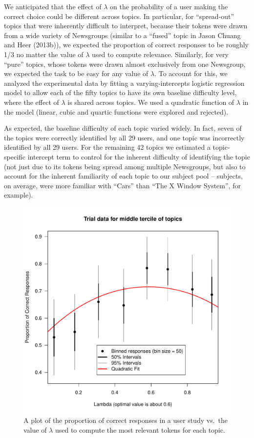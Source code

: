 \documentclass[12pt,]{isuthesis}
\begin{document}
We anticipated that the effect of \(\lambda\) on the probability of a
user making the correct choice could be different across topics. In
particular, for ``spread-out'' topics that were inherently difficult to
interpret, because their tokens were drawn from a wide variety of
Newsgroups (similar to a ``fused'' topic in Jason Chuang and Heer
(2013b)), we expected the proportion of correct responses to be roughly
1/3 no matter the value of \(\lambda\) used to compute relevance.
Similarly, for very ``pure'' topics, whose tokens were drawn almost
exclusively from one Newsgroup, we expected the task to be easy for any
value of \(\lambda\). To account for this, we analyzed the experimental
data by fitting a varying-intercepts logistic regression model to allow
each of the fifty topics to have its own baseline difficulty level,
where the effect of \(\lambda\) is shared across topics. We used a
quadratic function of \(\lambda\) in the model (linear, cubic and
quartic functions were explored and rejected).

As expected, the baseline difficulty of each topic varied widely. In
fact, seven of the topics were correctly identified by all 29 users, and
one topic was incorrectly identified by all 29 users. For the remaining
42 topics we estimated a topic-specific intercept term to control for
the inherent difficulty of identifying the topic (not just due to its
tokens being spread among multiple Newsgroups, but also to account for
the inherent familiarity of each topic to our subject pool -- subjects,
on average, were more familiar with ``Cars'' than ``The X Window
System'', for example).

\begin{figure}[htbp]
\centering
\includegraphics{images/fig_lambda.pdf}
\caption{\label{fig:lambda}A plot of the proportion of correct responses in
a user study vs.~the value of \(\lambda\) used to compute the most
relevant tokens for each topic.}
\end{figure}
\end{document}
